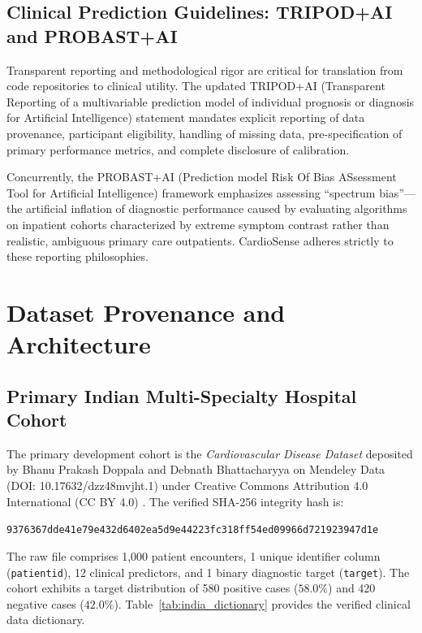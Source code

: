 \documentclass[conference]{IEEEtran}
\begin{document}
\subsection{Clinical Prediction Guidelines: TRIPOD+AI and PROBAST+AI}
Transparent reporting and methodological rigor are critical for translation from code repositories to clinical utility. The updated TRIPOD+AI (Transparent Reporting of a multivariable prediction model of individual prognosis or diagnosis for Artificial Intelligence) statement \cite{collins2024} mandates explicit reporting of data provenance, participant eligibility, handling of missing data, pre-specification of primary performance metrics, and complete disclosure of calibration. 

Concurrently, the PROBAST+AI (Prediction model Risk Of Bias ASsessment Tool for Artificial Intelligence) \cite{moons2025} framework emphasizes assessing ``spectrum bias''—the artificial inflation of diagnostic performance caused by evaluating algorithms on inpatient cohorts characterized by extreme symptom contrast rather than realistic, ambiguous primary care outpatients. CardioSense adheres strictly to these reporting philosophies.

\section{Dataset Provenance and Architecture}

\subsection{Primary Indian Multi-Specialty Hospital Cohort}
The primary development cohort is the \textit{Cardiovascular Disease Dataset} deposited by Bhanu Prakash Doppala and Debnath Bhattacharyya on Mendeley Data (DOI: 10.17632/dzz48mvjht.1) under Creative Commons Attribution 4.0 International (CC BY 4.0) \cite{mendeleyindia}. The verified SHA-256 integrity hash is:
\begin{center}
\texttt{9376367dde41e79e432d6402ea5d9e44223fc318ff54ed09966d721923947d1e}
\end{center}

The raw file comprises 1,000 patient encounters, 1 unique identifier column (\texttt{patientid}), 12 clinical predictors, and 1 binary diagnostic target (\texttt{target}). The cohort exhibits a target distribution of 580 positive cases ($58.0\%$) and 420 negative cases ($42.0\%$). Table~\ref{tab:india_dictionary} provides the verified clinical data dictionary.
\end{document}
